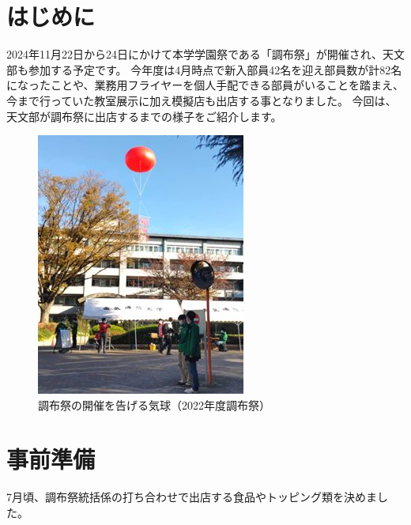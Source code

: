 \documentclass[../super_nova_20yy]{subfiles}
\begin{document}
\small

\section{はじめに}

2024年11月22日から24日にかけて本学学園祭である「調布祭」が開催され、天文部も参加する予定です。
今年度は4月時点で新入部員42名を迎え部員数が計82名になったことや、業務用フライヤーを個人手配できる部員がいることを踏まえ、今まで行っていた教室展示に加え模擬店も出店する事となりました。
今回は、天文部が調布祭に出店するまでの様子をご紹介します。

\begin{figure}[H]
  \centering
  \includegraphics[width=.5\columnwidth]{画像1.jpg}
  \caption{調布祭の開催を告げる気球（2022年度調布祭）}
  \label{fig:1}
\end{figure}

\section{事前準備}

7月頃、調布祭統括係の打ち合わせで出店する食品やトッピング類を決めました。
\end{document}
